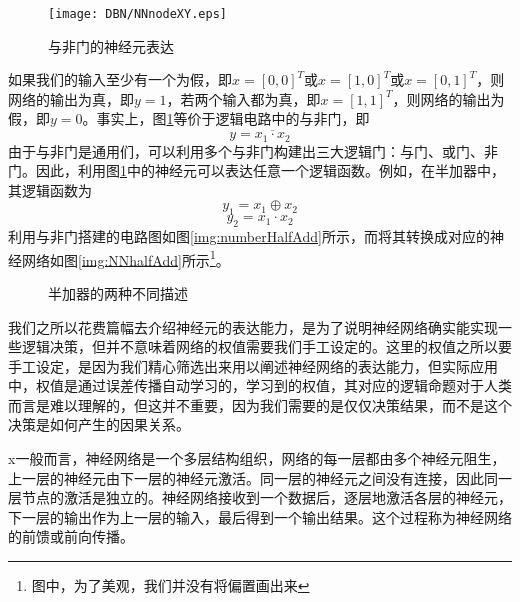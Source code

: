 \begin{figure}[!htbp]
\centering
\texttt{[image: DBN/NNnodeXY.eps]}
\caption{与非门的神经元表达}
\label{img:NNnodeXY.png}
\end{figure}

如果我们的输入至少有一个为假，即$x = [0,0]^T$或$x = [1,0]^T$或$x = [0,1]^T$，则网络的输出为真，即$y=1$，若两个输入都为真，即$x = [1,1]^T$，则网络的输出为假，即$y=0$。事实上，图\ref{img:NNnodeXY.png}等价于逻辑电路中的与非门，即
\begin{equation}
y = \overline{ x_1\cdot x_2}
\end{equation}
由于与非门是通用们，可以利用多个与非门构建出三大逻辑门：与门、或门、非门。因此，利用图\ref{img:NNnodeXY.png}中的神经元可以表达任意一个逻辑函数。例如，在半加器中，其逻辑函数为
\begin{equation}
y_1 = x_1 \oplus x_2
\end{equation}
\begin{equation}
y_2 = x_1 \cdot x_2
\end{equation}
利用与非门搭建的电路图如图\ref{img:numberHalfAdd}所示，而将其转换成对应的神经网络如图\ref{img:NNhalfAdd}所示\footnote{图中，为了美观，我们并没有将偏置画出来}。

\begin{figure}[htbp]
\centering
\subfigure{\label{img:numberHalfAdd}}\addtocounter{subfigure}{-2}
\subfigure{\label{img:NNhalfAdd}}\addtocounter{subfigure}{-2}
\caption{半加器的两种不同描述}
\label{img:halfAdd}
\vspace{-1em}
\end{figure}

我们之所以花费篇幅去介绍神经元的表达能力，是为了说明神经网络确实能实现一些逻辑决策，但并不意味着网络的权值需要我们手工设定的。这里的权值之所以要手工设定，是因为我们精心筛选出来用以阐述神经网络的表达能力，但实际应用中，权值是通过误差传播自动学习的，学习到的权值，其对应的逻辑命题对于人类而言是难以理解的，但这并不重要，因为我们需要的是仅仅决策结果，而不是这个决策是如何产生的因果关系。

x一般而言，神经网络是一个多层结构组织，网络的每一层都由多个神经元阻生，上一层的神经元由下一层的神经元激活。同一层的神经元之间没有连接，因此同一层节点的激活是独立的。神经网络接收到一个数据后，逐层地激活各层的神经元，下一层的输出作为上一层的输入，最后得到一个输出结果。这个过程称为神经网络的前馈或前向传播。

